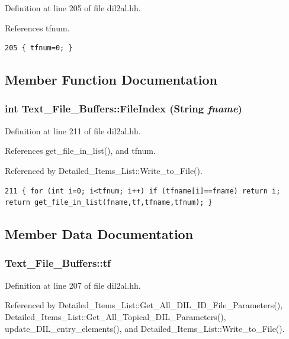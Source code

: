 Definition at line 205 of file dil2al.hh.

References tfnum.



\footnotesize\begin{verbatim}205 { tfnum=0; }
\end{verbatim}\normalsize 


\subsection{Member Function Documentation}
\subsubsection{\setlength{\rightskip}{0pt plus 5cm}int Text\_\-File\_\-Buffers::File\-Index ({\bf String} {\em fname})\hspace{0.3cm}{\tt  [inline]}}\label{classText__File__Buffers_a1}




Definition at line 211 of file dil2al.hh.

References get\_\-file\_\-in\_\-list(), and tfnum.

Referenced by Detailed\_\-Items\_\-List::Write\_\-to\_\-File().



\footnotesize\begin{verbatim}211 { for (int i=0; i<tfnum; i++) if (tfname[i]==fname) return i; return get_file_in_list(fname,tf,tfname,tfnum); }
\end{verbatim}\normalsize 


\subsection{Member Data Documentation}
\subsubsection{ Text\_\-File\_\-Buffers::tf}\label{classText__File__Buffers_m0}




Definition at line 207 of file dil2al.hh.

Referenced by Detailed\_\-Items\_\-List::Get\_\-All\_\-DIL\_\-ID\_\-File\_\-Parameters(), Detailed\_\-Items\_\-List::Get\_\-All\_\-Topical\_\-DIL\_\-Parameters(), update\_\-DIL\_\-entry\_\-elements(), and Detailed\_\-Items\_\-List::Write\_\-to\_\-File().
